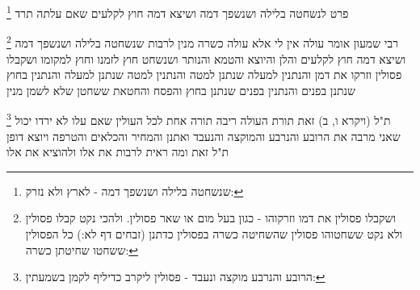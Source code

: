 \documentclass[12pt, openany]{book}
\newcommand{\footnotecomment}[1]{
	\renewcommand\thefootnote{}
	\footnote{#1}}
\newcommand{\commenta}[1]{\footnotecomment{#1}}
\begin{document}
{{\commenta{שנשחטה בלילה ושנשפך דמה - לארץ ולא נזרק:}
פרט לנשחטה בלילה ושנשפך דמה ושיצא דמה חוץ לקלעים שאם עלתה תרד 
\commenta{ושקבלו פסולין את דמו וזרקוהו - כגון בעל מום או שאר פסולין. ולהכי נקט קבלו פסולין ולא נקט ששחטוהו פסולין שהשחיטה כשרה בפסולין כדתנן (זבחים דף לא:) כל הפסולין ששחטו שחיטתן כשרה:}
רבי שמעון אומר עולה אין לי אלא עולה כשרה מנין לרבות שנשחטה בלילה ושנשפך דמה ושיצא דמה חוץ לקלעים והלן והיוצא והטמא והנותר ושנשחט חוץ לזמנו וחוץ למקומו
ושקבלו פסולין וזרקו את דמן והנתנין למעלה שנתנן למטה והנתנין למטה שנתנן למעלה והנתנין בחוץ שנתנן בפנים והנתנין בפנים שנתנן בחוץ והפסח והחטאת ששחטן שלא לשמן מנין 
\commenta{הרובע והנרבע מוקצה ונעבד - פסולין ליקרב כדיליף לקמן בשמעתין:}
ת"ל (ויקרא ו, ב) זאת תורת העולה ריבה תורה אחת לכל העולין שאם עלו לא ירדו 
יכול שאני מרבה את הרובע והנרבע והמוקצה והנעבד ואתנן והמחיר והכלאים והטרפה ויוצא דופן ת"ל זאת 
ומה ראית לרבות את אלו ולהוציא את אלו
\clearpage}

}
\end{document}
